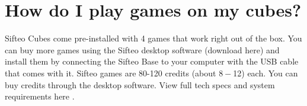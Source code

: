 \section{How do I play games on my cubes?}
Sifteo Cubes come pre-installed with 4 games that work right out of the box. You can buy more games using the Sifteo desktop software (download here) and install them by connecting the Sifteo Base to your computer with the USB cable that comes with it. Sifteo games are 80-120 credits (about $8-$12) each. You can buy credits through the desktop software.
View full tech specs and system requirements here .

